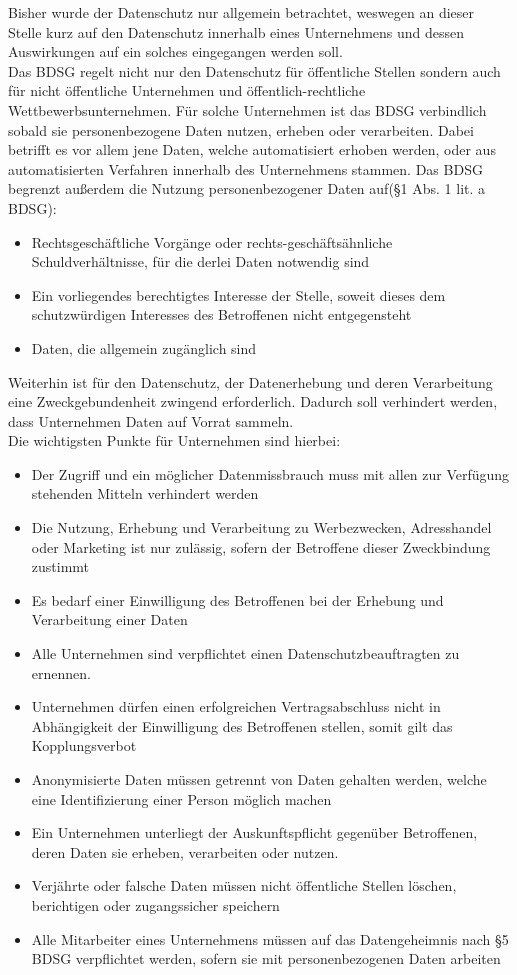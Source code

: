 \documentclass[a4paper, 12pt]{article}
\begin{document}
Bisher wurde der Datenschutz nur allgemein betrachtet, weswegen an dieser Stelle kurz auf den Datenschutz innerhalb eines Unternehmens und dessen Auswirkungen auf ein solches eingegangen werden soll.
\\Das BDSG regelt nicht nur den Datenschutz für öffentliche Stellen sondern auch für nicht öffentliche Unternehmen und öffentlich-rechtliche Wettbewerbsunternehmen. Für solche Unternehmen ist das BDSG verbindlich sobald sie personenbezogene Daten nutzen, erheben oder verarbeiten. Dabei betrifft es vor allem jene Daten, welche automatisiert erhoben werden, oder aus automatisierten Verfahren innerhalb des Unternehmens stammen.
Das BDSG begrenzt außerdem die Nutzung personenbezogener Daten auf(§1 Abs. 1 lit. a BDSG):\\
\begin{itemize}
	\item Rechtsgeschäftliche Vorgänge oder rechts-geschäftsähnliche Schuldverhältnisse, für die derlei Daten notwendig sind
	\item Ein vorliegendes berechtigtes Interesse der Stelle, soweit dieses dem schutzwürdigen Interesses des Betroffenen nicht entgegensteht
	\item Daten, die allgemein zugänglich sind
\end{itemize}
\noindent Weiterhin ist für den Datenschutz, der Datenerhebung und deren Verarbeitung eine Zweckgebundenheit zwingend erforderlich. Dadurch soll verhindert werden, dass Unternehmen Daten auf Vorrat sammeln.\\
Die wichtigsten Punkte für Unternehmen sind hierbei:
\begin{itemize}
	\item Der Zugriff und ein möglicher Datenmissbrauch muss mit allen zur Verfügung stehenden Mitteln verhindert werden
	\item Die Nutzung, Erhebung und Verarbeitung zu Werbezwecken, Adresshandel oder Marketing ist nur zulässig, sofern der Betroffene dieser Zweckbindung zustimmt
	\item Es bedarf einer Einwilligung des Betroffenen bei der Erhebung und Verarbeitung einer Daten
	\item Alle Unternehmen sind verpflichtet einen Datenschutzbeauftragten zu ernennen.
	\item Unternehmen dürfen einen erfolgreichen Vertragsabschluss nicht in Abhängigkeit der Einwilligung des Betroffenen stellen, somit gilt das Kopplungsverbot
	\item Anonymisierte Daten müssen getrennt von Daten gehalten werden, welche eine Identifizierung einer Person möglich machen
	\item Ein Unternehmen unterliegt der Auskunftspflicht gegenüber Betroffenen, deren Daten sie erheben, verarbeiten oder nutzen.
	\item Verjährte oder falsche Daten müssen nicht öffentliche Stellen löschen, berichtigen oder zugangssicher speichern
	\item Alle Mitarbeiter eines Unternehmens müssen auf das Datengeheimnis nach §5 BDSG verpflichtet werden, sofern sie mit personenbezogenen Daten arbeiten
\end{itemize}
\end{document}
